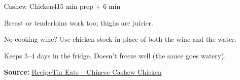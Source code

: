 \begin{recipebox}{Cashew Chicken}{4}{15 min prep + 6 min}
\begin{notelist}
  \item Breast or tenderloins work too; thighs are juicier.
  \item No cooking wine? Use chicken stock in place of both the wine and the water.
  \item Keeps 3--4 days in the fridge. Doesn't freeze well (the sauce goes watery).
\end{notelist}

\noindent\textbf{Source:} \href{https://www.recipetineats.com/chinese-cashew-chicken/}{RecipeTin Eats -- Chinese Cashew Chicken}

\end{recipebox}
